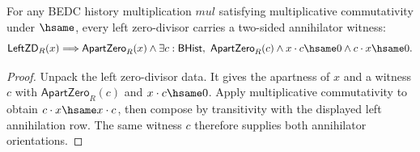 \begin{theorem}
\label{thm:commring-left-zero-divisor-strict-of-mul-comm}
For any BEDC history multiplication $mul$ satisfying multiplicative
commutativity under $\hsame$, every left zero-divisor carries a two-sided
annihilator witness:
$$
\mathsf{LeftZD}_R(x)
\Longrightarrow
\mathsf{ApartZero}_R(x)\land
\exists c:\mathsf{BHist},\
\mathsf{ApartZero}_R(c)\land x\cdot c\hsame0\land c\cdot x\hsame0.
$$
\end{theorem}
\begin{proof}
Unpack the left zero-divisor data. It gives the apartness of $x$ and a witness
$c$ with $\mathsf{ApartZero}_R(c)$ and $x\cdot c\hsame0$. Apply multiplicative
commutativity to obtain $c\cdot x\hsame x\cdot c$, then compose by transitivity
with the displayed left annihilation row. The same witness $c$ therefore supplies
both annihilator orientations.
\end{proof}


